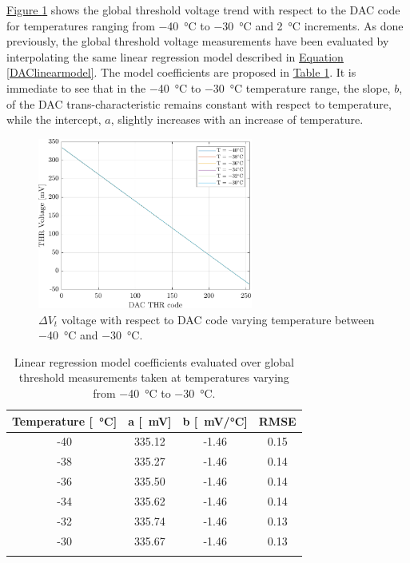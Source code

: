 \par
\hyperref[figDACthrtemp4030]{Figure \ref{figDACthrtemp4030}} shows the global threshold voltage trend with respect to the DAC code for temperatures ranging from \SI{-40}{\celsius} to \SI{-30}{\celsius} and \SI{2}{\celsius} increments. As done previously, the global threshold voltage measurements have been evaluated by interpolating the same linear regression model described in \hyperref[DAClinearmodel]{Equation \ref{DAClinearmodel}}. The model coefficients are proposed in \hyperref[tabDAClinearmodel2]{Table \ref{tabDAClinearmodel2}}. It is immediate to see that in the \SI{-40}{\celsius} to \SI{-30}{\celsius} temperature range, the slope, $b$, of the DAC trans-characteristic remains constant with respect to temperature, while the intercept, $a$, slightly increases with an increase of temperature.

\begin{figure}[h!]
    \centering
    \includegraphics[width=0.63\textwidth]{Images/chap1/results/DAC_thr/DAC_thr_voltage_40-30.pdf}
    \caption{$\Delta V_{\textit{t}}$ voltage with respect to DAC code varying temperature between \SI{-40}{\celsius} and \SI{-30}{\celsius}.}
    \label{figDACthrtemp4030}
\end{figure}

\begin{table}[h!]
    \centering
    \begin{tabular}{c c c c} 
        \Xhline{2\arrayrulewidth}
        Temperature [\SI{}{\celsius}] & a [\SI{}{\milli\volt}] & b [\SI{}{\milli\volt/\celsius}] & RMSE \T\B \\
        \hline
        -40 & 335.12 & -1.46 & 0.15 \T\B \\
        -38 & 335.27 & -1.46 & 0.14 \T\B \\
        -36 & 335.50 & -1.46 & 0.14 \T\B \\
        -34 & 335.62 & -1.46 & 0.14 \T\B \\
        -32 & 335.74 & -1.46 & 0.13 \T\B \\
        -30 & 335.67 & -1.46 & 0.13 \T\B \\
        \Xhline{2\arrayrulewidth}
    \end{tabular}
    \caption{Linear regression model coefficients evaluated over global threshold measurements taken at temperatures varying from \SI{-40}{\celsius} to \SI{-30}{\celsius}.}
    \label{tabDAClinearmodel2}
\end{table}

